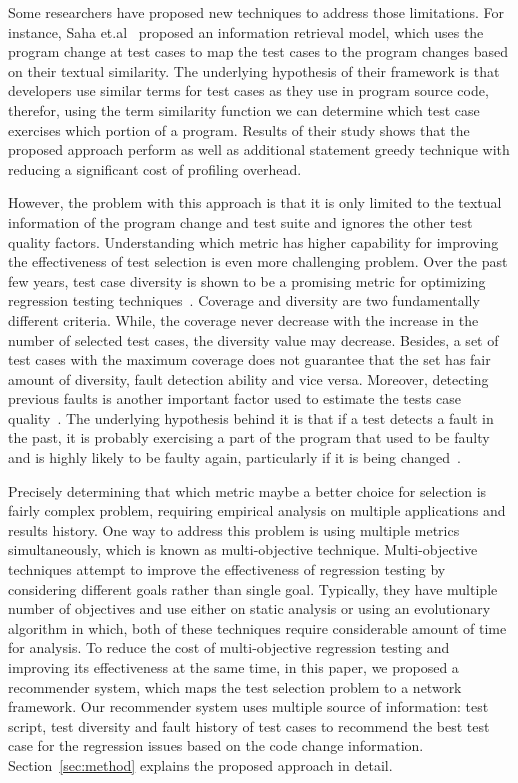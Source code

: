 Some researchers have proposed new techniques to address those limitations. 
For instance, Saha et.al~\cite{sarfaraz} proposed an information retrieval 
model, which uses the program change at test cases to map the test cases 
to the program changes based on their textual similarity.  
The underlying hypothesis of their framework is that
developers use similar terms for test cases as they use in program source code, therefor, 
using the term similarity function we can determine which 
test case exercises which portion of a program.  
Results of their study shows that the proposed 
approach perform as well as additional statement greedy 
technique with reducing a significant cost of profiling overhead. 

However, the problem with this approach is that it is 
only limited to the textual information of the program change
and test suite and ignores the other test quality factors.
Understanding which metric has higher capability for improving the 
effectiveness of test selection is even more challenging problem. 
Over the past few  years, test case diversity is shown to be a promising
metric for optimizing regression testing techniques~\cite{}.
Coverage and diversity are two fundamentally different criteria. 
While, the coverage never decrease with the increase in the number 
of selected test cases, the diversity value may decrease. 
Besides, a set of test cases with the maximum coverage 
does not guarantee that the set
has fair amount of diversity, fault detection ability and vice versa.
Moreover, detecting previous faults is another important factor used
to estimate the tests case quality~\cite{hemmati}. 
The underlying hypothesis behind it is that if a test detects a fault in the past, it
is probably exercising a part of the program that used to be faulty 
and is highly likely to be faulty again, 
particularly if it is being changed~\cite{hemmati 3, 4}.

Precisely determining that which metric maybe a better choice for 
selection is fairly complex problem, requiring 
empirical analysis on multiple applications and results history. 
One way to address this problem is using multiple metrics 
simultaneously, which is known as multi-objective technique. 
Multi-objective techniques attempt to improve 
the effectiveness of regression testing by considering different 
goals rather than single goal. 
Typically, they have multiple number 
of objectives and use either on static analysis or
using an evolutionary algorithm in which, both of these 
techniques require considerable amount of time for analysis. 
To reduce the cost of multi-objective regression testing
and improving its effectiveness at the same time, in this paper, we proposed a
recommender system, which maps the test selection problem to a network framework.
Our recommender system uses multiple source of information:
test script, test diversity and fault history of test cases to recommend the 
best test case for the regression issues based on the code change information. 
Section~\ref{sec:method} explains the proposed approach in detail.



